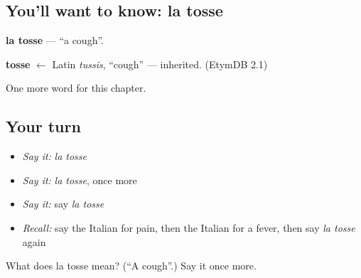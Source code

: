 \subsection*{You'll want to know: la tosse}
\textbf{la tosse} — \textquotedblleft{}a cough\textquotedblright{}.

\begin{cousinweb}
\textbf{tosse} $\leftarrow$ Latin \emph{tussis}, \textquotedblleft{}cough\textquotedblright{} — inherited. (EtymDB 2.1)
\end{cousinweb}

\begin{grammarlens}[title={What you've built}]
One more word for this chapter.
\end{grammarlens}

\subsection*{Your turn}
\begin{itemize}
\raggedright
  \item \emph{Say it:} \emph{la tosse}
  \item \emph{Say it:} \emph{la tosse}, once more
  \item \emph{Say it:} say \emph{la tosse}
  \item \emph{Recall:} say the Italian for pain, then the Italian for a fever, then say \emph{la tosse} again
\end{itemize}

\begin{tcolorbox}[breakable,colback=teal!4,colframe=teal!35!black,title={Before you move on}]
What does la tosse mean? (\textquotedblleft{}A cough\textquotedblright{}.) Say it once more.
\end{tcolorbox}
